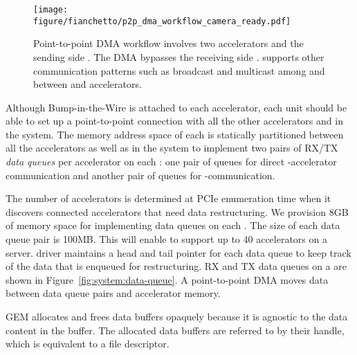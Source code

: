 \begin{figure}[t!]
    \centering
    \texttt{[image: figure/fianchetto/p2p\_dma\_workflow\_camera\_ready.pdf]}
    \caption{Point-to-point DMA workflow involves two accelerators and the sending side \drx. 
    The DMA bypasses the receiving side \drx.
    \dmx supports other communication patterns such as broadcast and multicast among \drxs and between \drxs and accelerators.
    }
    \label{fig:system:p2pdma}
\end{figure}

Although Bump-in-the-Wire \drx is attached to each accelerator, each \drx unit should be able to set up a point-to-point connection with all the other accelerators and \drxs in the system.
%
The memory address space of each \drx is statically partitioned between all the accelerators as well as \drxs in the system to implement two pairs of RX/TX \textit{data queues} per accelerator on each \drx: one pair of queues for direct \drx-accelerator communication and another pair of queues for \drx-\drx communication.
%

The number of accelerators is determined at PCIe enumeration time when it discovers connected accelerators that need data restructuring. We provision 8GB of memory space for implementing data queues on each \drx. The size of each data queue pair is 100MB. This will enable \dmx to support up to 40 accelerators on a server. 
%
\drx driver maintains a head and tail pointer for each data queue to keep track of the data that is enqueued for restructuring. 
%
RX and TX data queues on a \drx are shown in Figure~\ref{fig:system:data-queue}.
%
A point-to-point DMA moves data between data queue pairs and accelerator memory. %
%


GEM allocates and frees data buffers opaquely because it is agnostic to the data content in the buffer. %
%
The allocated data buffers are referred to by their handle, which is equivalent to a file descriptor. %

